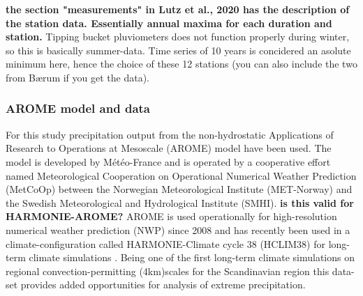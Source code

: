 \textbf{the section "measurements" in Lutz et al., 2020 has the description of the station data. Essentially annual maxima for each duration and station.} Tipping bucket pluviometers does not function properly during winter, so this is basically summer-data. Time series of 10 years is concidered an asolute minimum here, hence the choice of these 12 stations (you can also include the two from Bærum if you get the data). 

\subsubsection{AROME model and data}

For this study precipitation output from the non-hydrostatic Applications of Research to Operations at Mesoscale (AROME)\cite{seity_arome} model have been used. The model is developed by Météo-France and is operated by a cooperative effort named Meteorological Cooperation on Operational Numerical Weather Prediction (MetCoOp) between the Norwegian Meteorological Institute (MET-Norway) and the Swedish Meteorological and Hydrological Institute (SMHI). \textbf{is this valid for HARMONIE-AROME?} AROME is used operationally for high-resolution numerical weather prediction (NWP) since 2008 and has recently been used in a climate-configuration called HARMONIE-Climate cycle 38 (HCLIM38) for long-term climate simulations \cite{lind_arome]}. Being one of the first long-term climate simulations on regional convection-permitting (\<4km)scales for the Scandinavian region this data-set provides added opportunities for analysis of extreme precipitation. 

